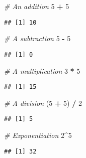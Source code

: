 \documentclass[]{book}
\newenvironment{Shaded}{\begin{snugshade}}{\end{snugshade}}
\newcommand{\CommentTok}[1]{\textcolor[rgb]{0.56,0.35,0.01}{\textit{#1}}}
\newcommand{\DecValTok}[1]{\textcolor[rgb]{0.00,0.00,0.81}{#1}}
\newcommand{\NormalTok}[1]{#1}
\newcommand{\OperatorTok}[1]{\textcolor[rgb]{0.81,0.36,0.00}{\textbf{#1}}}
\newcommand{\StringTok}[1]{\textcolor[rgb]{0.31,0.60,0.02}{#1}}
\begin{document}
\begin{Shaded}
\begin{Highlighting}[]
\CommentTok{# An addition}
\DecValTok{5} \OperatorTok{+}\StringTok{ }\DecValTok{5}
\end{Highlighting}
\end{Shaded}

\begin{verbatim}
## [1] 10
\end{verbatim}

\begin{Shaded}
\begin{Highlighting}[]
\CommentTok{# A subtraction}
\DecValTok{5} \OperatorTok{-}\StringTok{ }\DecValTok{5} 
\end{Highlighting}
\end{Shaded}

\begin{verbatim}
## [1] 0
\end{verbatim}

\begin{Shaded}
\begin{Highlighting}[]
\CommentTok{# A multiplication}
\DecValTok{3} \OperatorTok{*}\StringTok{ }\DecValTok{5}
\end{Highlighting}
\end{Shaded}

\begin{verbatim}
## [1] 15
\end{verbatim}

\begin{Shaded}
\begin{Highlighting}[]
 \CommentTok{# A division}
\NormalTok{(}\DecValTok{5} \OperatorTok{+}\StringTok{ }\DecValTok{5}\NormalTok{) }\OperatorTok{/}\StringTok{ }\DecValTok{2} 
\end{Highlighting}
\end{Shaded}

\begin{verbatim}
## [1] 5
\end{verbatim}

\begin{Shaded}
\begin{Highlighting}[]
\CommentTok{# Exponentiation}
\DecValTok{2}\OperatorTok{^}\DecValTok{5}
\end{Highlighting}
\end{Shaded}

\begin{verbatim}
## [1] 32
\end{verbatim}
\end{document}
